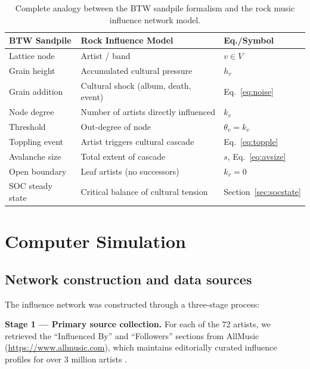 \documentclass[12pt, a4paper]{article}
\begin{document}
\begin{table}[H]
\centering
\caption{Complete analogy between the BTW sandpile formalism
  and the rock music influence network model.}
\label{tab:analogy}
\small
\begin{tabular}{p{3.8cm} p{5.2cm} p{2.4cm}}
\toprule
\textbf{BTW Sandpile} & \textbf{Rock Influence Model} & \textbf{Eq./Symbol} \\
\midrule
Lattice node        & Artist / band                         & $v\in V$ \\
Grain height        & Accumulated cultural pressure         & $h_v$ \\
Grain addition      & Cultural shock (album, death, event)  & Eq.~\ref{eq:noise} \\
Node degree         & Number of artists directly influenced & $k_v$ \\
Threshold           & Out-degree of node                    & $\theta_v=k_v$ \\
Toppling event      & Artist triggers cultural cascade      & Eq.~\ref{eq:topple} \\
Avalanche size      & Total extent of cascade               & $s$, Eq.~\ref{eq:avsize} \\
Open boundary       & Leaf artists (no successors)          & $k_v=0$ \\
SOC steady state    & Critical balance of cultural tension  & Section~\ref{sec:socstate} \\
\bottomrule
\end{tabular}
\end{table}


\section{Computer Simulation}
\label{sec:simulation}

\subsection{Network construction and data sources}

The influence network was constructed through a three-stage process:

\textbf{Stage 1 — Primary source collection.}
For each of the 72 artists, we retrieved the ``Influenced By''
and ``Followers'' sections from AllMusic
(\url{https://www.allmusic.com}), which maintains
editorially curated influence profiles for over 3 million artists
\citep{allmusic2024}.
\end{document}
